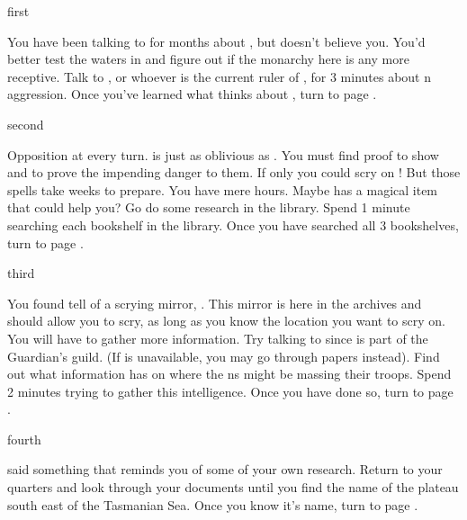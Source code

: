 \documentclass[greennotebook]{NeptuneBall}
\begin{document}

\startnotebook{\nIndianAggression{}}

\begin{page}{first}

You have been talking to \cPrince{} for months about \pIndia{}, but \cPrince{\they} doesn't believe you. You'd better test the waters in \pAtlantis{} and figure out if the monarchy here is any more receptive. Talk to \cKing{}, or whoever is the current ruler of \pAtlantis{}, for 3 minutes about \pIndia{}n aggression. Once you've learned what \pAtlantis{} thinks about \pIndia{}, turn to page .

\end{page}

\begin{page}{second}

Opposition at every turn. \pAtlantis{} is just as oblivious as \pPacifica{}. You must find proof to show \cPrince{} and \cKing{} to prove the impending danger to them. If only you could scry on \pIndia{}! But those spells take weeks to prepare. You have mere hours. Maybe \pAtlantis{} has a magical item that could help you? Go do some research in the library. Spend 1 minute searching each bookshelf in the library. Once you have searched all 3 bookshelves, turn to page .

\end{page}

\begin{page}{third}

You found tell of a scrying mirror, \iScryingMirror{}. This mirror is here in the archives and should allow you to scry, as long as you know the location you want to scry on. You will have to gather more information. Try talking to \cGeneral{} since \cGeneral{\they} is part of the Guardian's guild. (If \cGeneral{} is unavailable, you may go through \cGeneral{\their} papers instead). Find out what information \cGeneral{} has on where the \pIndia{}ns might be massing their troops. Spend 2 minutes trying to gather this intelligence. Once you have done so, turn to page .

\end{page}

\begin{page}{fourth} %

\cGeneral{} said something that reminds you of some of your own research. Return to your quarters and look through your documents until you find the name of the plateau south east of the Tasmanian Sea. Once you know it's name, turn to page .

\end{page}
\end{document}
